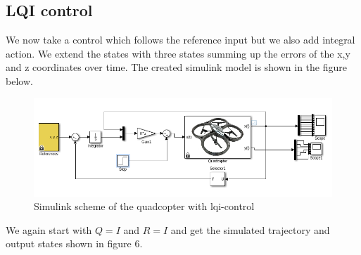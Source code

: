 \documentclass[]{article}
\begin{document}
\subsection{LQI control}
We now take a control which follows the reference input but we also add integral action. We extend the states with three states summing up the errors of the x,y and z coordinates over time. The created simulink model is shown in the figure below.

\begin{figure}[H]
\centering
\includegraphics[width=.9\textwidth]{lqischeme.png}
\caption{Simulink scheme of the quadcopter with lqi-control}
\end{figure}

We again start with $Q = I$ and $R = I$ and get the simulated trajectory and output states shown in figure 6.   
\end{document}
